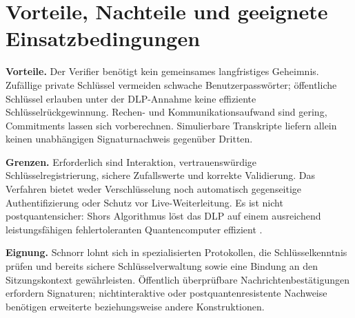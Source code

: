 \section{Vorteile, Nachteile und geeignete Einsatzbedingungen}\label{sec:bewertung}
\textbf{Vorteile.} Der Verifier benötigt kein gemeinsames langfristiges Geheimnis. Zufällige private Schlüssel vermeiden schwache Benutzerpasswörter; öffentliche Schlüssel erlauben unter der DLP-Annahme keine effiziente Schlüsselrückgewinnung. Rechen- und Kommunikationsaufwand sind gering, Commitments lassen sich vorberechnen. Simulierbare Transkripte liefern allein keinen unabhängigen Signaturnachweis gegenüber Dritten.

\textbf{Grenzen.} Erforderlich sind Interaktion, vertrauenswürdige Schlüsselregistrierung, sichere Zufallswerte und korrekte Validierung. Das Verfahren bietet weder Verschlüsselung noch automatisch gegenseitige Authentifizierung oder Schutz vor Live-Weiterleitung. Es ist nicht postquantensicher: Shors Algorithmus löst das DLP auf einem ausreichend leistungsfähigen fehlertoleranten Quantencomputer effizient \cite{shor1997}.

\textbf{Eignung.} Schnorr lohnt sich in spezialisierten Protokollen, die Schlüsselkenntnis prüfen und bereits sichere Schlüsselverwaltung sowie eine Bindung an den Sitzungskontext gewährleisten. Öffentlich überprüfbare Nachrichtenbestätigungen erfordern Signaturen; nichtinteraktive oder postquantenresistente Nachweise benötigen erweiterte beziehungsweise andere Konstruktionen.
